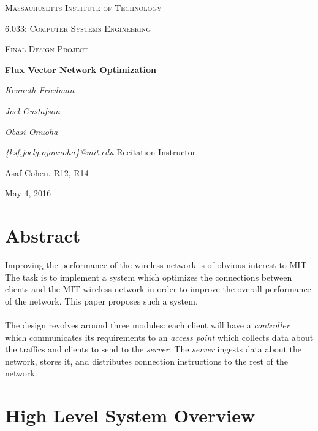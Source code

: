 \documentclass[10pt,journal,compsoc]{IEEEtran}
\begin{document}
\begin{titlepage}
	\centering
	{\scshape Massachusetts Institute of Technology  \par}
	\vspace{3cm}
	{\scshape\LARGE 6.033: Computer Systems Engineering\par}
	\vspace{1cm}
	{\scshape\Large Final Design Project \par}
	\vspace{1.5cm}
	{\huge\bfseries Flux Vector Network Optimization\par}
	\vspace{2cm}
	{\Large\itshape Kenneth Friedman\par}
		{\Large\itshape Joel Gustafson \par}
			{\Large\itshape Obasi Onuoha \par}
	\vspace{.25cm}
	\textit{{\small\{ksf,joelg,ojonuoha\}@mit.edu}}
	\vfill
	Recitation Instructor\par
	Asaf Cohen. R12, R14

	\vfill

	{\large May 4, 2016\par}
\end{titlepage}

		
	
    \section{Abstract}
	    Improving the performance of the wireless network is of obvious interest to MIT. The task is to implement a system which optimizes the connections between clients and the MIT wireless network in order to improve the overall performance of the network. This paper proposes such a system.\\
		\\
		The design revolves around three modules: each client will have a \emph{controller} which communicates its requirements to an \emph{access point} which collects data about the traffics and clients to send to the \emph{server}. The \emph{server} ingests data about the network, stores it, and distributes connection instructions to the rest of the network.
		
		\section{High Level System Overview}
		
\end{document}

